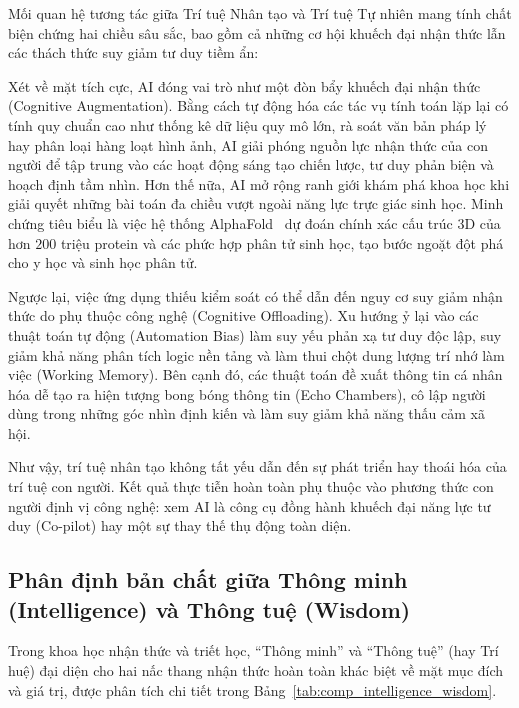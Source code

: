 Mối quan hệ tương tác giữa Trí tuệ Nhân tạo và Trí tuệ Tự nhiên mang tính chất biện chứng hai chiều sâu sắc, bao gồm cả những cơ hội khuếch đại nhận thức lẫn các thách thức suy giảm tư duy tiềm ẩn:

Xét về mặt tích cực, AI đóng vai trò như một đòn bẩy khuếch đại nhận thức (Cognitive Augmentation). Bằng cách tự động hóa các tác vụ tính toán lặp lại có tính quy chuẩn cao như thống kê dữ liệu quy mô lớn, rà soát văn bản pháp lý hay phân loại hàng loạt hình ảnh, AI giải phóng nguồn lực nhận thức của con người để tập trung vào các hoạt động sáng tạo chiến lược, tư duy phản biện và hoạch định tầm nhìn. Hơn thế nữa, AI mở rộng ranh giới khám phá khoa học khi giải quyết những bài toán đa chiều vượt ngoài năng lực trực giác sinh học. Minh chứng tiêu biểu là việc hệ thống AlphaFold~\citep{week2_alphafold2021,week2_alphafold2024} dự đoán chính xác cấu trúc 3D của hơn $200$ triệu protein và các phức hợp phân tử sinh học, tạo bước ngoặt đột phá cho y học và sinh học phân tử.

Ngược lại, việc ứng dụng thiếu kiểm soát có thể dẫn đến nguy cơ suy giảm nhận thức do phụ thuộc công nghệ (Cognitive Offloading). Xu hướng ỷ lại vào các thuật toán tự động (Automation Bias) làm suy yếu phản xạ tư duy độc lập, suy giảm khả năng phân tích logic nền tảng và làm thui chột dung lượng trí nhớ làm việc (Working Memory). Bên cạnh đó, các thuật toán đề xuất thông tin cá nhân hóa dễ tạo ra hiện tượng bong bóng thông tin (Echo Chambers), cô lập người dùng trong những góc nhìn định kiến và làm suy giảm khả năng thấu cảm xã hội.

Như vậy, trí tuệ nhân tạo không tất yếu dẫn đến sự phát triển hay thoái hóa của trí tuệ con người. Kết quả thực tiễn hoàn toàn phụ thuộc vào phương thức con người định vị công nghệ: xem AI là công cụ đồng hành khuếch đại năng lực tư duy (Co-pilot) hay một sự thay thế thụ động toàn diện.

\subsection{Phân định bản chất giữa Thông minh (Intelligence) và Thông tuệ (Wisdom)}

Trong khoa học nhận thức và triết học, ``Thông minh'' và ``Thông tuệ'' (hay Trí huệ) đại diện cho hai nấc thang nhận thức hoàn toàn khác biệt về mặt mục đích và giá trị, được phân tích chi tiết trong Bảng~\ref{tab:comp_intelligence_wisdom}.

